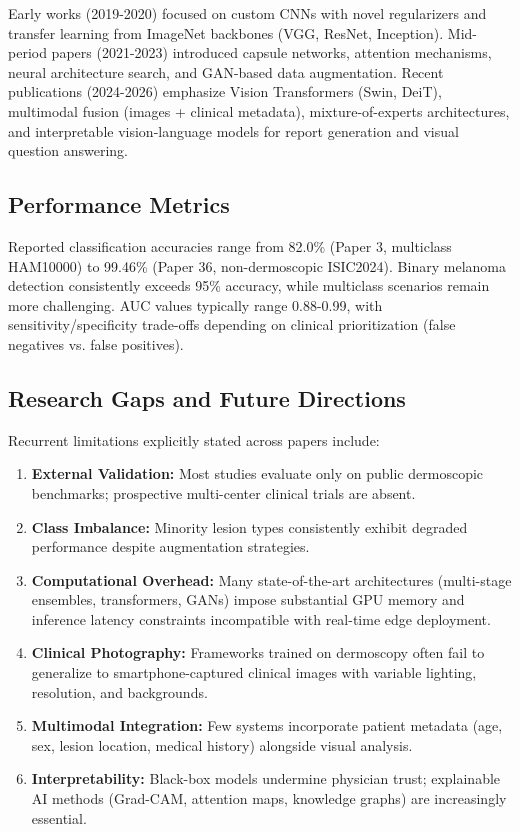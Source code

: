 \documentclass[conference]{IEEEtran}
\begin{document}
Early works (2019-2020) focused on custom CNNs with novel regularizers and transfer learning from ImageNet backbones (VGG, ResNet, Inception). Mid-period papers (2021-2023) introduced capsule networks, attention mechanisms, neural architecture search, and GAN-based data augmentation. Recent publications (2024-2026) emphasize Vision Transformers (Swin, DeiT), multimodal fusion (images + clinical metadata), mixture-of-experts architectures, and interpretable vision-language models for report generation and visual question answering.

\subsection{Performance Metrics}

Reported classification accuracies range from 82.0\% (Paper 3, multiclass HAM10000) to 99.46\% (Paper 36, non-dermoscopic ISIC2024). Binary melanoma detection consistently exceeds 95\% accuracy, while multiclass scenarios remain more challenging. AUC values typically range 0.88-0.99, with sensitivity/specificity trade-offs depending on clinical prioritization (false negatives vs. false positives).

\subsection{Research Gaps and Future Directions}

Recurrent limitations explicitly stated across papers include:

\begin{enumerate}
\item \textbf{External Validation:} Most studies evaluate only on public dermoscopic benchmarks; prospective multi-center clinical trials are absent.
\item \textbf{Class Imbalance:} Minority lesion types consistently exhibit degraded performance despite augmentation strategies.
\item \textbf{Computational Overhead:} Many state-of-the-art architectures (multi-stage ensembles, transformers, GANs) impose substantial GPU memory and inference latency constraints incompatible with real-time edge deployment.
\item \textbf{Clinical Photography:} Frameworks trained on dermoscopy often fail to generalize to smartphone-captured clinical images with variable lighting, resolution, and backgrounds.
\item \textbf{Multimodal Integration:} Few systems incorporate patient metadata (age, sex, lesion location, medical history) alongside visual analysis.
\item \textbf{Interpretability:} Black-box models undermine physician trust; explainable AI methods (Grad-CAM, attention maps, knowledge graphs) are increasingly essential.
\end{enumerate}
\end{document}
